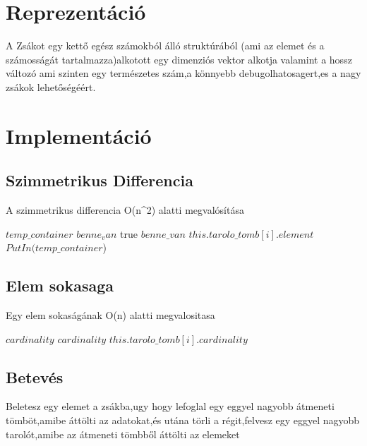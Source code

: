 \documentclass{article}
\begin{document}
\section{Reprezentáció}
A Zsákot egy kettő egész számokból álló struktúrából (ami az elemet és a számosságát tartalmazza)alkotott egy dimenziós vektor alkotja valamint a hossz változó ami szinten egy természetes szám,a könnyebb debugolhatosagert,es a nagy zsákok lehetőségéért.

\section{Implementáció}
\subsection{Szimmetrikus Differencia}
A szimmetrikus differencia O(n^2) alatti megvalósítása
\begin{algorithmic}[1]
            \State $temp\_container$
            \State $benne_van$
                    \State true \leftarrow $benne\_van$
                    \EndIf
                    \EndFor
                 \State    $this.tarolo\_tomb[i].element$ \leftarrow $PutIn(temp\_container$)
                    \EndIf
                \EndFor
        \EndProcedure
        \end{algorithmic}
        \subsection{Elem sokasaga}
        Egy elem sokaságának O(n) alatti megvalositasa
        \begin{algorithmic}[2]
             \leftarrow $cardinality$
                    \State $cardinality$ \leftarrow $this.tarolo\_tomb[i].cardinality$
                    \EndIf
                \EndFor
        \EndProcedure
        \end{algorithmic}
\subsection{Betevés}
Beletesz egy elemet a zsákba,ugy hogy lefoglal egy eggyel nagyobb átmeneti tömböt,amibe áttölti az adatokat,és utána törli a régit,felvesz egy eggyel nagyobb tarolót,amibe az átmeneti tömbből áttölti az elemeket
\end{document}
